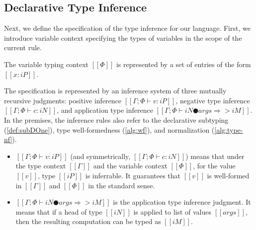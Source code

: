 \documentclass[acmsmall,natbib=false,review,anonymous]{acmart}
\begin{document}
\subsection{Declarative Type Inference}

Next, we define the specification of the type 
inference for our language. First, we introduce 
variable context specifying the types of variables 
in the scope of the current rule. 

\begin{definition}
  The variable typing context $[[Φ]]$
  is represented by a set of entries of the form
  $[[x : iP]]$. 
\end{definition}

The specification is represented by an inference system of
three mutually recursive judgments:
positive inference $[[Γ ; Φ ⊢ v : iP]]$,
negative type inference $[[Γ ; Φ ⊢ c : iN]]$, and
application type inference $[[Γ ; Φ ⊢ iN ● args ⇒> iM ]]$.
In the premises, the inference rules also refer to 
the declarative subtyping (\cref{def:subDOne}),
type well-formedness (\cref{alg:wf}), 
and normalization (\cref{alg:type-nf}).
\begin{itemize}
  \item $[[Γ ; Φ ⊢ v : iP]]$ (and symmetrically, $[[Γ ; Φ ⊢ c : iN]]$)
    means that under the type context $[[Γ]]$ and
    the variable context $[[Φ]]$, for the value $[[v]]$,
    type $[[iP]]$ is inferrable. It guarantees that 
    $[[v]]$ is well-formed in $[[Γ]]$ and $[[Φ]]$ in
    the standard sense.
  \item $[[ Γ ; Φ ⊢ iN ● args ⇒> iM ]]$ is the application type inference 
    judgment. It means that if a head of type $[[iN]]$ 
    is applied to list of values $[[args]]$, 
    then the resulting computation can be typed as $[[iM]]$.
\end{itemize}

\begin{definition}
  \label{def:declarative-typing}
  \hfill
  \begin{multicols}{2}
  \ottdefnDTNInf{}
  \ottdefnDTPInf{}
  \ottdefnDTSpinInf{}
  \end{multicols}
\end{definition}
\end{document}
